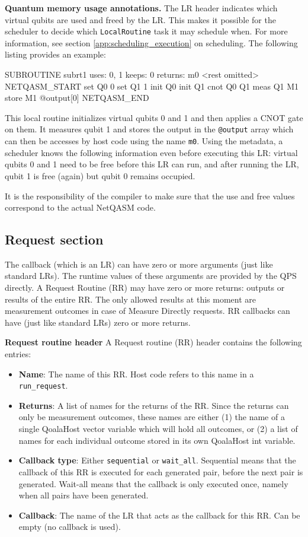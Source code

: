 \textbf{Quantum memory usage annotations.}
The LR header indicates which virtual qubits are used and freed by the LR. This makes it possible for the scheduler to decide which \texttt{LocalRoutine} task it may schedule when. For more information, see section \cref{app:scheduling_execution} on scheduling.
The following listing provides an example:

\begin{qoalacode}
SUBROUTINE subrt1
    uses: 0, 1
    keeps: 0
    returns: m0
    <rest omitted>
  NETQASM_START
    set Q0 0
    set Q1 1
    init Q0
    init Q1
    cnot Q0 Q1
    meas Q1 M1
    store M1 @output[0]
  NETQASM_END
\end{qoalacode}
This local routine initializes virtual qubits 0 and 1 and then applies a CNOT gate on them.
It measures qubit 1 and stores the output in the \texttt{@output} array which can then be accesses by host code using the name \texttt{m0}.
Using the metadata, a scheduler knows the following information even before executing this LR: virtual qubits 0 and 1 need to be free before this LR can run, and after running the LR, qubit 1 is free (again) but qubit 0 remains occupied.

It is the responsibility of the compiler to make sure that the use and free values correspond to the actual NetQASM code.


\subsection{Request section}
The callback (which is an LR) can have zero or more arguments (just like standard LRs). The runtime values of these arguments are provided by the QPS directly.
A Request Routine (RR) may have zero or more returns: outputs or results of the entire RR. The only allowed results at this moment are measurement outcomes in case of Measure Directly requests.
RR callbacks can have (just like standard LRs) zero or more returns.


\textbf{Request routine header}
A Request routine (RR) header contains the following entries:
\begin{itemize}
\item \textbf{Name}: The name of this RR. Host code refers to this name in a \texttt{run\_request}.
\item \textbf{Returns}: A list of names for the returns of the RR. Since the returns can only be measurement outcomes, these names are either (1) the name of a single QoalaHost vector variable which will hold all outcomes, or (2) a list of names for each individual outcome stored in its own QoalaHost int variable.
\item \textbf{Callback type}: Either \texttt{sequential} or \texttt{wait\_all}. Sequential means that the callback of this RR is executed for each generated pair, before the next pair is generated. Wait-all means that the callback is only executed once, namely when all pairs have been generated.
\item \textbf{Callback}: The name of the LR that acts as the callback for this RR. Can be empty (no callback is used).
\end{itemize}


